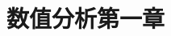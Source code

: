 \documentclass{ctexbeamer}
\title{数值分析第一章}
\theoremstyle{definition}
\begin{document}
\begin{frame}
\titlepage
\end{frame}





\end{document}
